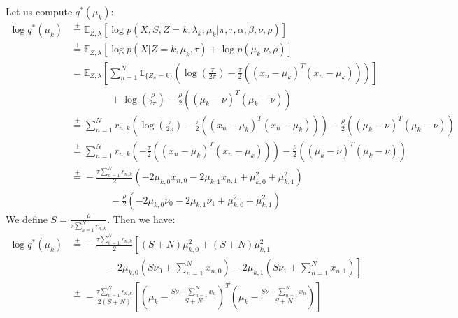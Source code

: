 \documentclass{article}
\begin{document}
\noindent Let us compute $q^*(\mu_k)$:
\begin{equation}
  \begin{split}
    \log q^*(\mu_k) & \overset{+}{=} \mathbb{E}_{Z,\lambda}[\log p(X,S,Z = k,\lambda_k,\mu_k|\pi,\tau,\alpha,\beta,\nu,\rho)]                                                                                                  \\
                    & \overset{+}{=} \mathbb{E}_{Z,\lambda}[\log p(X|Z = k,\mu_k,\tau) + \log p(\mu_k|\nu,\rho)]                                                                                                               \\
                    & = \mathbb{E}_{Z,\lambda}\left[\sum_{n=1}^{N}\mathbb{1}_{\{Z_n = k\}}\left(\log \left(\frac{\tau}{2\pi}\right) -\frac{\tau}{2}\left((x_n - \mu_k)^T(x_n - \mu_k)\right)\right)\right]                     \\
                    & \qquad\qquad + \log \left(\frac{\rho}{2\pi}\right) - \frac{\rho}{2}\left((\mu_k - \nu)^T(\mu_k - \nu)\right)                                                                                             \\
                    & \overset{+}{=} \sum_{n=1}^{N}r_{n,k}\left(\log \left(\frac{\tau}{2\pi}\right) - \frac{\tau}{2}\left((x_n - \mu_k)^T(x_n - \mu_k)\right)\right) - \frac{\rho}{2}\left((\mu_k - \nu)^T(\mu_k - \nu)\right) \\
                    & \overset{+}{=} \sum_{n=1}^{N}r_{n,k}\left(-\frac{\tau}{2}\left((x_n - \mu_k)^T(x_n - \mu_k)\right)\right) - \frac{\rho}{2}\left((\mu_k - \nu)^T(\mu_k - \nu)\right)                                      \\
                    & \overset{+}{=} - \frac{\tau\sum_{n=1}^{N}r_{n,k}}{2}\left(-2\mu_{k,0}x_{n,0} -2\mu_{k,1}x_{n,1} +\mu_{k,0}^2 +\mu_{k,1}^2\right)                                                                         \\
                    & \qquad\qquad - \frac{\rho}{2}\left(-2\mu_{k,0}\nu_0 -2\mu_{k,1}\nu_1 +\mu_{k,0}^2 +\mu_{k,1}^2\right)
  \end{split}
\end{equation}
We define $S = \frac{\rho}{\tau\sum_{n=1}^{N}r_{n,k}}$. Then we have:
\begin{equation}
  \begin{split}
    \log q^*(\mu_k) & \overset{+}{=} -\frac{\tau\sum_{n=1}^{N}r_{n,k}}{2}\left[(S+N)\mu_{k,0}^2 + (S+N)\mu_{k,1}^2 \right.                                                                                      \\
                    & \qquad\qquad \left. -2\mu_{k,0}(S\nu_0 + \sum_{n=1}^{N}x_{n,0}) -2\mu_{k,1}(S\nu_1 + \sum_{n=1}^{N}x_{n,1})\right]                                                                        \\
                    & \overset{+}{=} -\frac{\tau\sum_{n=1}^{N}r_{n,k}}{2(S+N)}\left[\left(\mu_k - \frac{S\nu + \sum_{n=1}^{N}x_n}{S+N}\right)^T\left(\mu_k - \frac{S\nu + \sum_{n=1}^{N}x_n}{S+N}\right)\right]
  \end{split}
\end{equation}
\end{document}

